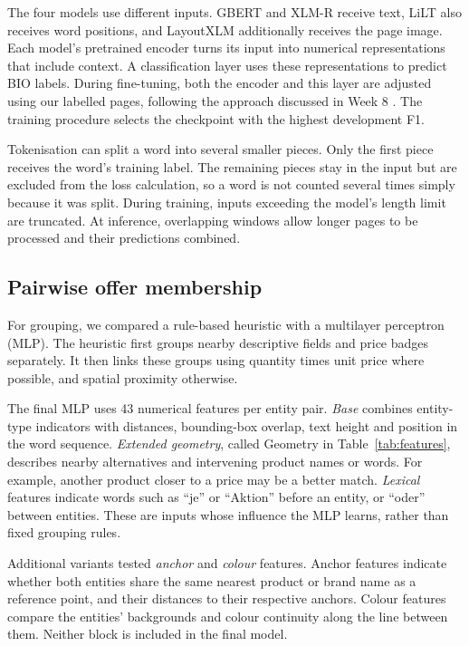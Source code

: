 The four models use different inputs. GBERT and XLM-R receive text, LiLT also receives word positions, and LayoutXLM additionally receives the page image. Each model's pretrained encoder turns its input into numerical representations that include context. A classification layer uses these representations to predict BIO labels. During fine-tuning, both the encoder and this layer are adjusted using our labelled pages, following the approach discussed in Week 8 \citep[p.~21]{iecourse2026}. The training procedure selects the checkpoint with the highest development F1.

Tokenisation can split a word into several smaller pieces. Only the first piece receives the word's training label. The remaining pieces stay in the input but are excluded from the loss calculation, so a word is not counted several times simply because it was split. During training, inputs exceeding the model's length limit are truncated. At inference, overlapping windows allow longer pages to be processed and their predictions combined.

\subsection{Pairwise offer membership}\label{sec:pair-features}
For grouping, we compared a rule-based heuristic with a multilayer perceptron (MLP). The heuristic first groups nearby descriptive fields and price badges separately. It then links these groups using quantity times unit price where possible, and spatial proximity otherwise.

The final MLP uses 43 numerical features per entity pair. \emph{Base} combines entity-type indicators with distances, bounding-box overlap, text height and position in the word sequence. \emph{Extended geometry}, called Geometry in Table~\ref{tab:features}, describes nearby alternatives and intervening product names or words. For example, another product closer to a price may be a better match. \emph{Lexical} features indicate words such as ``je'' or ``Aktion'' before an entity, or ``oder'' between entities. These are inputs whose influence the MLP learns, rather than fixed grouping rules.

Additional variants tested \emph{anchor} and \emph{colour} features. Anchor features indicate whether both entities share the same nearest product or brand name as a reference point, and their distances to their respective anchors. Colour features compare the entities' backgrounds and colour continuity along the line between them. Neither block is included in the final model.

